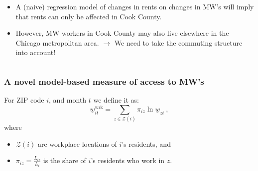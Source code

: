 \documentclass[aspectratio=169, t]{beamer}
\newcommand{\Z}{\mathcal{Z}}
\begin{document}
\begin{frame}
\begin{columns}
\begin{column}{0.56\textwidth}
\begin{itemize}
                \vspace{2mm}
                \pause
                \item A (naive) regression model of changes in rents on changes in MW's will imply that rents 
                can only be affected in Cook County.
                \vspace{2mm}
                \pause
                \item However, MW workers in Cook County may also live elsewhere in the 
                Chicago metropolitan area. $\to$ We need to take the commuting structure into account! 
            \end{itemize}
        \end{column}
    \end{columns}
\end{frame}

\begin{frame}
\frametitle{A novel model-based measure of access to MW's}

        For ZIP code $i$, and month $t$ we define it as:
	$$
	\underline{w}^{\text{wrk}}_{it} = 
	\sum_{z \in \Z(i)} \pi_{i z} \ln \underline{w}_{zt} \ ,
	$$
	\vspace{-2.5mm}
	where
	\vspace{1mm}
	\begin{itemize} \small
		\item $\Z(i)$ are workplace locations of $i$'s residents, and
		\item $\pi_{i z} = \frac{L_{i z}}{L_i}$ is the share of $i$'s residents who work 
		in $z$.
	\end{itemize}
\end{frame}
\end{document}

